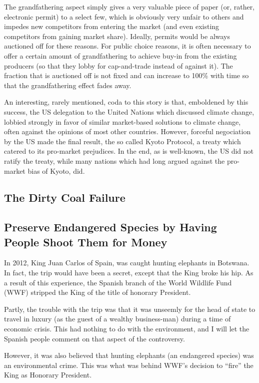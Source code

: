 The grandfathering aspect simply gives a very valuable piece of paper (or,
rather, electronic permit) to a select few, which is obviously very unfair to
others and impedes new competitors from entering the market (and even existing
competitors from gaining market share). Ideally, permits would be always
auctioned off for these reasons. For public choice reasons, it is often
necessary to offer a certain amount of grandfathering to achieve buy-in from
the existing producers (so that they lobby for cap-and-trade instead of against
it). The fraction that is auctioned off is not fixed and can increase to 100\%
with time so that the grandfathering effect fades away.

An interesting, rarely mentioned, coda to this story is that, emboldened by
this success, the US delegation to the United Nations which discussed climate
change, lobbied strongly in favor of similar market-based solutions to climate
change, often against the opinions of most other countries. However, forceful
negociation by the US made the final result, the so called Kyoto Protocol, a
treaty which catered to its pro-market prejudices. In the end, as is
well-known, the US did not ratify the treaty, while many nations which had long
argued against the pro-market bias of Kyoto, did.

\subsection{The Dirty Coal Failure}

\subsection{Preserve Endangered Species by Having People Shoot Them for Money}

In 2012, King Juan Carlos of Spain, was caught hunting elephants in Botswana.
In fact, the trip would have been a secret, except that the King broke his hip.
As a result of this experience, the Spanish branch of the World Wildlife Fund
(WWF) stripped the King of the title of honorary President.

Partly, the trouble with the trip was that it was unseemly for the head of
state to travel in luxury (as the guest of a wealthy business-man) during a
time of economic crisis. This had nothing to do with the environment, and I
will let the Spanish people comment on that aspect of the controversy.

However, it was also believed that hunting elephants (an endangered species)
was an environmental crime. This was what was behind WWF's decision to ``fire''
the King as Honorary President.

